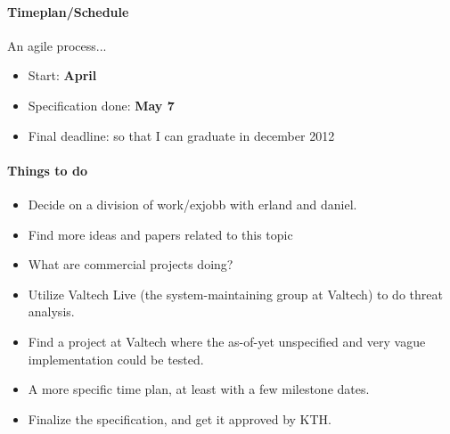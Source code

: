 \documentclass[a4paper,11pt]{kth-mag}
\begin{document}
\paragraph{Timeplan/Schedule}

An agile process...

\begin{itemize}
	\item Start: \textbf{April}
	\item Specification done: \textbf{May 7}
	\item Final deadline: so that I can graduate in december 2012
\end{itemize}

\paragraph{Things to do}

\begin{itemize}

\item Decide on a division of work/exjobb with erland and daniel.

\item Find more ideas and papers related to this topic

\item What are commercial projects doing?

\item Utilize Valtech Live (the system-maintaining group at Valtech) to do threat analysis.

\item Find a project at Valtech where the as-of-yet unspecified and very vague implementation could be tested.

\item A more specific time plan, at least with a few milestone dates.

\item Finalize the specification, and get it approved by KTH.

\end{itemize}
\end{document}
